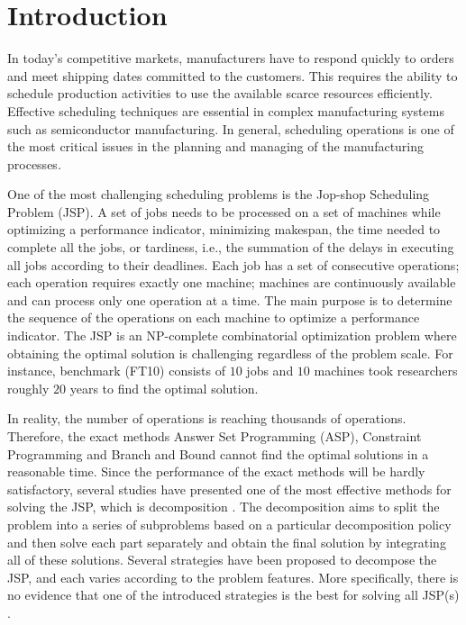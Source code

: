 \documentclass{tlp} %
\begin{document}
\section{Introduction}
In today's competitive markets, manufacturers have to respond quickly to orders and meet shipping dates committed to the customers. This requires the ability to schedule production activities to use the available scarce resources efficiently. Effective scheduling techniques are essential in complex manufacturing systems such as semiconductor manufacturing. In general, scheduling operations is one of the most critical issues in the planning and managing of the manufacturing processes\cite{uzsoy2000performance}. 

One of the most challenging scheduling problems is the Jop-shop Scheduling Problem (JSP). A set of jobs needs to be processed on a set of machines while optimizing a performance indicator, minimizing makespan, the time needed to complete all the jobs, or tardiness, i.e., the summation of the delays in executing all jobs according to their deadlines. Each job has a set of consecutive operations; each operation requires exactly one machine; machines are continuously available and can process only one operation at a time. The main purpose is to determine the sequence of the operations on each machine to optimize a performance indicator. The JSP is an NP-complete combinatorial optimization problem where obtaining the optimal solution is challenging regardless of the problem scale\cite{garey1976complexity,lenstra1977complexity,liu2008prediction}. For instance, benchmark (FT10) consists of $10$ jobs and $10$ machines took researchers roughly $20$ years to find the optimal solution\cite{adams1988shifting,zhang2010hybrid}.

In reality, the number of operations is reaching thousands of operations. Therefore, the exact methods Answer Set Programming (ASP), Constraint Programming and Branch and Bound cannot find the optimal solutions in a reasonable time\cite{daneshamooz2021mathematical,shi2021solving,francescutto2021solving}. Since the performance of the exact methods will be hardly satisfactory, several studies have presented one of the most effective methods for solving the JSP, which is decomposition \cite{zhang2010hybrid}. The decomposition aims to split the problem into a series of subproblems based on a particular decomposition policy and then solve each part separately and obtain the final solution by integrating all of these solutions. Several strategies have been proposed to decompose the JSP, and each varies according to the problem features. More specifically, there is no evidence that one of the introduced strategies is the best for solving all JSP(s) \cite{ovacik2012decomposition}. 
\end{document}
